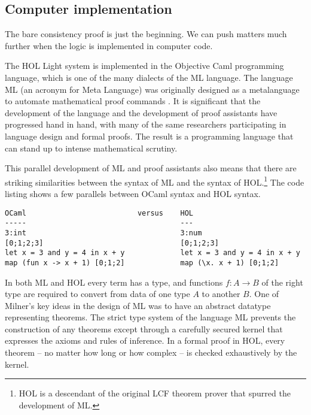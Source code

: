 \documentclass[brochure,english,12pt]{bourbaki}
\theoremstyle{plain}
\begin{document}
\subsection{Computer implementation}

The bare consistency proof is just the beginning.  We can push matters  much further when
the logic is implemented in computer code.

The HOL Light system is implemented in the Objective Caml programming language, which is one of the many dialects of the ML
language.  The language ML (an acronym for Meta Language) was originally designed as a
metalanguage to automate mathematical proof commands \cite{Gor}.  It is significant that the development
of the  language and the development of proof assistants have progressed hand in hand, with many
of the same researchers participating in language design and formal proofs.  
The result is a programming language that can stand up to intense mathematical scrutiny.

This parallel development of ML and proof assistants
 also means that there are striking similarities between
the syntax of ML and the syntax of HOL.\footnote{HOL is a descendant of the original LCF theorem prover that
spurred the development of ML.}    The code listing shows a few parallels between OCaml syntax and
HOL syntax.

\begin{lstlisting}[keepspaces=true,stringstyle=\tt,basicstyle=\small,frame=single,framesep=8pt,mathescape,morekeywords={type,let,and,in,OCaml,HOL},columns=flexible]
OCaml                          versus    HOL
-----                                    ---
3:int                                    3:num
[0;1;2;3]                                [0;1;2;3]  
let x = 3 and y = 4 in x + y             let x = 3 and y = 4 in x + y
map (fun x -> x + 1) [0;1;2]             map (\x. x + 1) [0;1;2]
\end{lstlisting}



In both ML and HOL every term has a type, and  functions $f:A\to B$ of the right type
are required to convert from data of one type $A$ to another $B$.
One of Milner's key ideas in the design of ML was to have an abstract datatype representing theorems.
The strict type system of the language ML prevents the construction of any theorems except through
a carefully secured kernel that expresses the axioms and rules of inference.  In a formal proof in HOL, 
every theorem -- no matter how long or how complex -- is checked exhaustively by the kernel.
\end{document}
